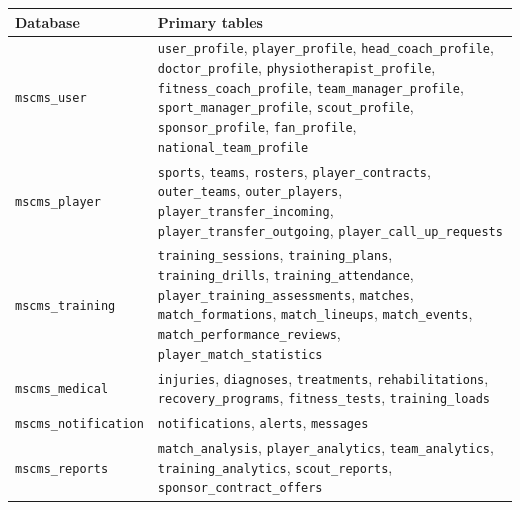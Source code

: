 \documentclass[12pt,a4paper,oneside]{report}
\begin{document}
\begin{longtable}{p{} p{}}
\toprule
\textbf{Database} & \textbf{Primary tables} \\
\midrule
\texttt{mscms\_user} &
  \texttt{user\_profile}, \texttt{player\_profile},
  \texttt{head\_coach\_profile}, \texttt{doctor\_profile},
  \texttt{physiotherapist\_profile}, \texttt{fitness\_coach\_profile},
  \texttt{team\_manager\_profile}, \texttt{sport\_manager\_profile},
  \texttt{scout\_profile}, \texttt{sponsor\_profile}, \texttt{fan\_profile},
  \texttt{national\_team\_profile} \\

\texttt{mscms\_player} &
  \texttt{sports}, \texttt{teams}, \texttt{rosters}, \texttt{player\_contracts},
  \texttt{outer\_teams}, \texttt{outer\_players},
  \texttt{player\_transfer\_incoming}, \texttt{player\_transfer\_outgoing},
  \texttt{player\_call\_up\_requests} \\

\texttt{mscms\_training} &
  \texttt{training\_sessions}, \texttt{training\_plans},
  \texttt{training\_drills}, \texttt{training\_attendance},
  \texttt{player\_training\_assessments}, \texttt{matches},
  \texttt{match\_formations}, \texttt{match\_lineups},
  \texttt{match\_events}, \texttt{match\_performance\_reviews},
  \texttt{player\_match\_statistics} \\

\texttt{mscms\_medical} &
  \texttt{injuries}, \texttt{diagnoses}, \texttt{treatments},
  \texttt{rehabilitations}, \texttt{recovery\_programs},
  \texttt{fitness\_tests}, \texttt{training\_loads} \\

\texttt{mscms\_notification} &
  \texttt{notifications}, \texttt{alerts}, \texttt{messages} \\

\texttt{mscms\_reports} &
  \texttt{match\_analysis}, \texttt{player\_analytics},
  \texttt{team\_analytics}, \texttt{training\_analytics},
  \texttt{scout\_reports}, \texttt{sponsor\_contract\_offers} \\
\bottomrule
\end{longtable}
\end{document}
